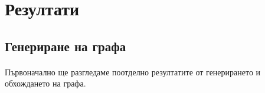 \section{Резултати}



\subsection*{Генериране на графа}

\paragraph*{} Първоначално ще разгледаме поотделно резултатите от генерирането и обхождането на графа.
